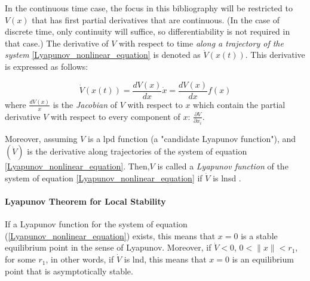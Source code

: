 \documentclass{thesisreport}
\begin{document}
In the continuous time case, the focus in this bibliography will be restricted to $V(x)$ that has first partial derivatives that are continuous. (In the case of discrete time, only continuity will suffice, so differentiability is not required in that case.) The derivative of $V$ with respect to time \textit{along a trajectory of the system} \ref{Lyapunov_nonlinear_equation} is denoted as $\dot{V}(x(t))$. This derivative is expressed as follows:

\begin{equation}
\dot{V}(x(t)) = \frac{dV(x)}{dx}\dot{x} = \frac{dV(x)}{dx}f(x)
\end{equation}
where 
$\frac{dV(x)}{x}$ is the \textit{Jacobian} of $V$ with respect to $x$ which contain the partial derivative $V$ with respect to every component of $x$: $\frac{\partial V}{\partial x_i}$.

Moreover, assuming $V$ is a lpd function (a "candidate Lyapunov function"), and $(\dot{V})$ is the derivative along trajectories of the system of equation \ref{Lyapunov_nonlinear_equation}. Then,$V$ is called a \textit{Lyapunov function} of the system of equation \ref{Lyapunov_nonlinear_equation} if $\dot{V}$ is lnsd \cite{Dahleh2011}.


\paragraph{Lyapunov Theorem for Local Stability}

If a Lyapunov function for the system of equation (\ref{Lyapunov_nonlinear_equation}) exists, this means that $x=0$ is a stable equilibrium point in the sense of Lyapunov. Moreover, if $\dot{V}<0$, $0<\|x\|<r_1$, for some $r_1$, in other words, if $\dot{V}$ is lnd, this means that $x=0$ is an equilibrium point that is asymptotically stable\cite{Dahleh2011}.
\end{document}
